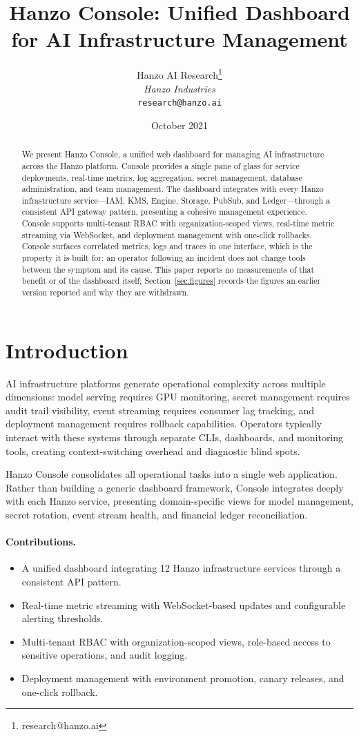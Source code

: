 \documentclass[11pt,twocolumn]{article}
\title{Hanzo Console: Unified Dashboard for AI Infrastructure Management}
\author{Hanzo AI Research\thanks{research@hanzo.ai} \\ \textit{Hanzo Industries} \\ \texttt{research@hanzo.ai}}
\date{October 2021}
\begin{document}
\hanzocoverpage

\begin{abstract}
We present Hanzo Console, a unified web dashboard for managing AI infrastructure across the Hanzo platform. Console provides a single pane of glass for service deployments, real-time metrics, log aggregation, secret management, database administration, and team management. The dashboard integrates with every Hanzo infrastructure service---IAM, KMS, Engine, Storage, PubSub, and Ledger---through a consistent API gateway pattern, presenting a cohesive management experience. Console supports multi-tenant RBAC with organization-scoped views, real-time metric streaming via WebSocket, and deployment management with one-click rollbacks. Console surfaces correlated metrics, logs and traces in one interface, which is the property it is built for: an operator following an incident does not change tools between the symptom and its cause. This paper reports no measurements of that benefit or of the dashboard itself; Section~\ref{sec:figures} records the figures an earlier version reported and why they are withdrawn.
\end{abstract}

\section{Introduction}

AI infrastructure platforms generate operational complexity across multiple dimensions: model serving requires GPU monitoring, secret management requires audit trail visibility, event streaming requires consumer lag tracking, and deployment management requires rollback capabilities. Operators typically interact with these systems through separate CLIs, dashboards, and monitoring tools, creating context-switching overhead and diagnostic blind spots.

Hanzo Console consolidates all operational tasks into a single web application. Rather than building a generic dashboard framework, Console integrates deeply with each Hanzo service, presenting domain-specific views for model management, secret rotation, event stream health, and financial ledger reconciliation.

\paragraph{Contributions.}
\begin{itemize}
    \item A unified dashboard integrating 12 Hanzo infrastructure services through a consistent API pattern.
    \item Real-time metric streaming with WebSocket-based updates and configurable alerting thresholds.
    \item Multi-tenant RBAC with organization-scoped views, role-based access to sensitive operations, and audit logging.
    \item Deployment management with environment promotion, canary releases, and one-click rollback.
\end{itemize}
\end{document}
